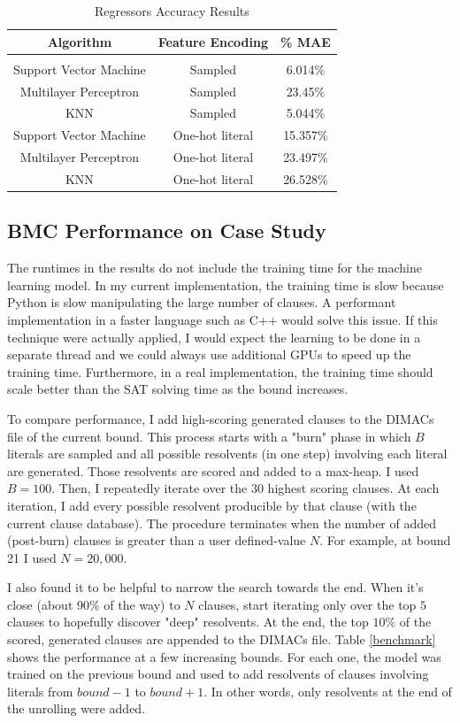 \documentclass[letterpaper]{article} %
\begin{document}
\begin{table}[h!]
\centering
\begin{tabular}{ c | c | c }
Algorithm & Feature Encoding & \% MAE \\
\hline \\
Support Vector Machine & Sampled & 6.014\% \\
Multilayer Perceptron & Sampled & 23.45\% \\
KNN & Sampled & 5.044\% \\ 
Support Vector Machine & One-hot literal & 15.357\% \\
Multilayer Perceptron & One-hot literal & 23.497\% \\
KNN & One-hot literal & 26.528\% 
\end{tabular}
\caption{Regressors Accuracy Results}
\label{acc-reg}
\end{table}

\subsection{BMC Performance on Case Study}

The runtimes in the results do not include the training time for the machine learning model. In my current implementation, the training time is slow because Python is slow manipulating the large number of clauses. A performant implementation in a faster language such as C++ would solve this issue. If this technique were actually applied, I would expect the learning to be done in a separate thread and we could always use additional GPUs to speed up the training time. Furthermore, in a real implementation, the training time should scale better than the SAT solving time as the bound increases.

To compare performance, I add high-scoring generated clauses to the DIMACs file of the current bound. This process starts with a "burn" phase in which $B$ literals are sampled and all possible resolvents (in one step) involving each literal are generated. Those resolvents are scored and added to a max-heap. I used $B=100$. Then, I repeatedly iterate over the $30$ highest scoring clauses. At each iteration, I add every possible resolvent producible by that clause (with the current clause database). The procedure terminates when the number of added (post-burn) clauses is greater than a user defined-value $N$. For example, at bound 21 I used $N=20,000$. 

I also found it to be helpful to narrow the search towards the end. When it's close (about 90\% of the way) to $N$ clauses, start iterating only over the top $5$ clauses to hopefully discover "deep" resolvents. At the end, the top $10\%$ of the scored, generated clauses are appended to the DIMACs file. Table \ref{benchmark} shows the performance at a few increasing bounds. For each one, the model was trained on the previous bound and used to add resolvents of clauses involving literals from $bound-1$ to $bound+1$. In other words, only resolvents at the end of the unrolling were added.
\end{document}

